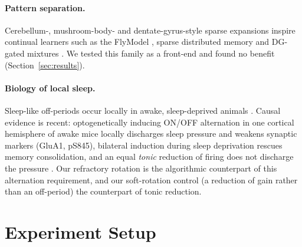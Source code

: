 \documentclass{article}
\begin{document}
\paragraph{Pattern separation.}
Cerebellum-, mushroom-body- and dentate-gyrus-style sparse expansions
\citep{caycogajic2017,caycogajic2019,litwin2017} inspire continual learners such as the FlyModel
\citep{shen2021}, sparse distributed memory \citep{bricken2023} and DG-gated mixtures
\citep{kapoor2026}. We tested this family as a front-end and found no benefit
(Section~\ref{sec:results}).

\paragraph{Biology of local sleep.}
Sleep-like off-periods occur locally in awake, sleep-deprived animals \citep{vyazovskiy2011}.
Causal evidence is recent: optogenetically inducing ON/OFF alternation in one cortical hemisphere
of awake mice locally discharges sleep pressure and weakens synaptic markers (GluA1, pS845),
bilateral induction during sleep deprivation rescues memory consolidation, and an equal
\emph{tonic} reduction of firing does not discharge the pressure \citep{driessen2026}. Our refractory rotation is the algorithmic counterpart of
this alternation requirement, and our soft-rotation control (a reduction of gain rather than
an off-period) the counterpart of tonic reduction.

\section{Experiment Setup}
\label{sec:setup}
\end{document}
